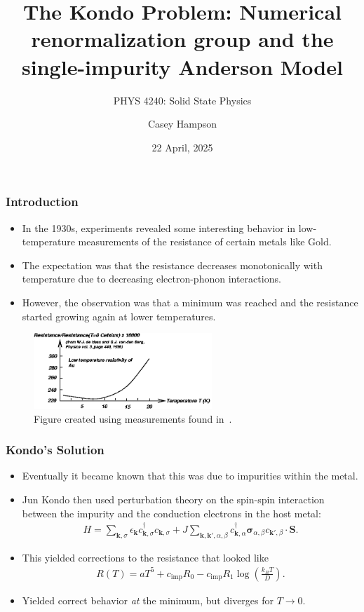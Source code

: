 \documentclass{beamer}
\title{The Kondo Problem: Numerical renormalization group and the single-impurity Anderson Model}
\subtitle{PHYS 4240: Solid State Physics}
\author{Casey Hampson}
\date{22 April, 2025}
\newcommand{\vv}[1]{\mathbf{\bm{#1}}}
\begin{document}
\frame{\titlepage}



\begin{frame}
  \frametitle{Introduction}

  \begin{itemize}
  \item In the 1930s, experiments revealed some interesting behavior in low-temperature measurements of the resistance of certain metals like Gold.
  \item The expectation was that the resistance decreases monotonically with temperature due to decreasing electron-phonon interactions.
  \item However, the observation was that a minimum was reached and the resistance started growing again at lower temperatures.
  \end{itemize}

  \begin{figure}
    \centering
    \includegraphics[width=0.6\textwidth]{./gfx/classickondo.png}
    \caption{Figure created using measurements found in~\cite{DeHaas_1936}.}
    \label{fig:classickondo}
  \end{figure}
  
\end{frame}


\begin{frame}
  \frametitle{Kondo's Solution}

  \begin{itemize}
  \item Eventually it became known that this was due to impurities within the metal.
  \item Jun Kondo then used perturbation theory on the spin-spin interaction between the impurity and the conduction electrons in the host metal:
    \begin{gather*}
      H = \sum_{\vv{k},\sigma} \epsilon_{\vv{k}}c^\dagger_{\vv{k},\sigma}c_{\vv{k},\sigma} + J\sum_{\vv{k},\vv{k}',\alpha,\beta} c^\dagger_{\vv{k},\alpha} \vv{\sigma}_{\alpha,\beta} c_{\vv{k}',\beta} \cdot \vv{S}.
    \end{gather*}
  \item This yielded corrections to the resistance that looked like
    \begin{gather*}
      R(T) = aT^5 + c_{\mathrm{imp}}R_0 - c_{\mathrm{imp}}R_1\log\left( \frac{k_B T}{D} \right).
    \end{gather*}
  \item Yielded correct behavior \textit{at} the minimum, but diverges for $T\rightarrow0$.
  \end{itemize}
\end{frame}
\end{document}
